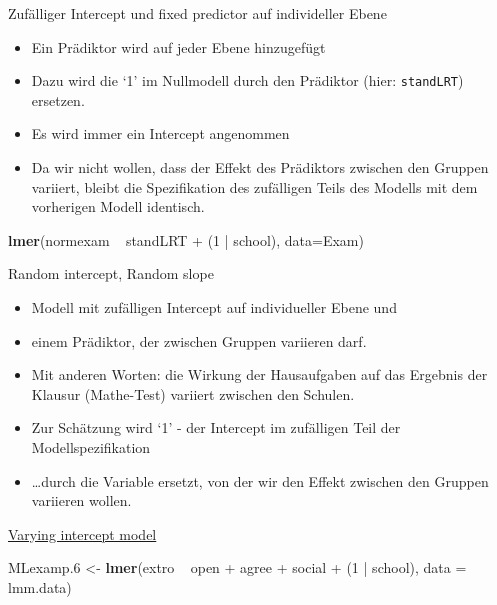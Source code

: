 \documentclass[ignorenonframetext,]{beamer}
\newenvironment{Shaded}{}{}
\newcommand{\KeywordTok}[1]{\textcolor[rgb]{0.00,0.44,0.13}{\textbf{{#1}}}}
\newcommand{\DataTypeTok}[1]{\textcolor[rgb]{0.56,0.13,0.00}{{#1}}}
\newcommand{\DecValTok}[1]{\textcolor[rgb]{0.25,0.63,0.44}{{#1}}}
\newcommand{\FloatTok}[1]{\textcolor[rgb]{0.25,0.63,0.44}{{#1}}}
\newcommand{\StringTok}[1]{\textcolor[rgb]{0.25,0.44,0.63}{{#1}}}
\newcommand{\NormalTok}[1]{{#1}}
\providecommand{\tightlist}{%
\setlength{\itemsep}{0pt}\setlength{\parskip}{0pt}}
\begin{document}
\begin{frame}[fragile]{Zufälliger Intercept und fixed predictor auf
individeller Ebene}

\begin{itemize}
\tightlist
\item
  Ein Prädiktor wird auf jeder Ebene hinzugefügt
\item
  Dazu wird die `1' im Nullmodell durch den Prädiktor (hier:
  \texttt{standLRT}) ersetzen.
\item
  Es wird immer ein Intercept angenommen
\item
  Da wir nicht wollen, dass der Effekt des Prädiktors zwischen den
  Gruppen variiert, bleibt die Spezifikation des zufälligen Teils des
  Modells mit dem vorherigen Modell identisch.
\end{itemize}

\begin{Shaded}
\begin{Highlighting}[]
\KeywordTok{lmer}\NormalTok{(normexam ~}\StringTok{ }\NormalTok{standLRT +}\StringTok{ }\NormalTok{(}\DecValTok{1} \NormalTok{|}\StringTok{ }\NormalTok{school), }\DataTypeTok{data=}\NormalTok{Exam)}
\end{Highlighting}
\end{Shaded}

\end{frame}

\begin{frame}{Random intercept, Random slope}

\begin{itemize}
\item
  Modell mit zufälligen Intercept auf individueller Ebene und
\item
  einem Prädiktor, der zwischen Gruppen variieren darf.
\item
  Mit anderen Worten: die Wirkung der Hausaufgaben auf das Ergebnis der
  Klausur (Mathe-Test) variiert zwischen den Schulen.
\item
  Zur Schätzung wird `1' - der Intercept im zufälligen Teil der
  Modellspezifikation
\item
  \ldots{}durch die Variable ersetzt, von der wir den Effekt zwischen
  den Gruppen variieren wollen.
\end{itemize}

\end{frame}

\begin{frame}[fragile]{\href{https://www.jaredknowles.com/journal/2013/11/25/getting-started-with-mixed-effect-models-in-r}{Varying
intercept model}}

\begin{Shaded}
\begin{Highlighting}[]
\NormalTok{MLexamp}\FloatTok{.6} \NormalTok{<-}\StringTok{ }\KeywordTok{lmer}\NormalTok{(extro ~}\StringTok{ }\NormalTok{open +}\StringTok{ }\NormalTok{agree +}\StringTok{ }\NormalTok{social +}\StringTok{ }\NormalTok{(}\DecValTok{1} \NormalTok{|}\StringTok{ }\NormalTok{school), }\DataTypeTok{data =} \NormalTok{lmm.data)}
\end{Highlighting}
\end{Shaded}

\end{frame}
\end{document}
